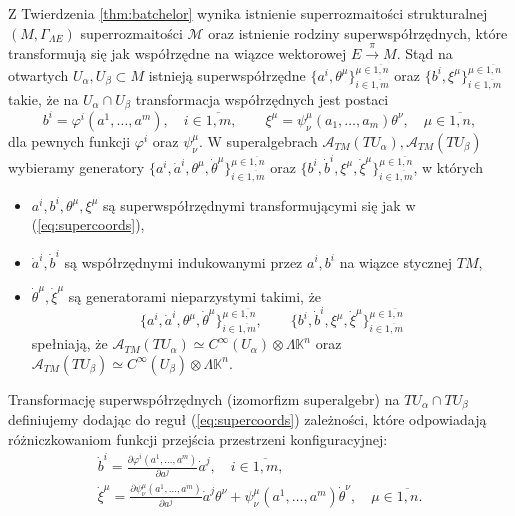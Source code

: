 \documentclass[11pt,a4paper]{report}
\theoremstyle{definition}
\begin{document}
Z Twierdzenia \ref{thm:batchelor} wynika istnienie superrozmaitości strukturalnej $(M, \Gamma_{\Lambda E})$ superrozmaitości $\mathcal{M}$ oraz istnienie rodziny superwspółrzędnych, które transformują się jak współrzędne na wiązce wektorowej $E \stackrel{\pi}{\rightarrow} M$. Stąd na otwartych $U_\alpha, U_\beta \subset M$ istnieją superwspółrzędne $\{a^i, \theta^\mu \}^{\mu \in \overline{1,n}} _{i \in \overline{1,m}}$ oraz $\{b^i, \xi^\mu \}^{\mu \in \overline{1,n}} _{i \in \overline{1,m}}$ takie, że na $U_\alpha \cap U_\beta$ transformacja współrzędnych jest postaci
\begin{equation}
	\label{eq:supercoords}
	b^i = \varphi^i(a^1, \ldots, a^m), \quad i \in \overline{1,m}, \qquad
	\xi^\mu = \psi_\nu^\mu(a_1, \ldots, a_m) \theta^\nu, \quad \mu \in \overline{1,n},
\end{equation}
dla pewnych  funkcji $\varphi^i$ oraz $\psi^\mu _\nu$. W superalgebrach $\mathcal{A}_{TM}(TU_\alpha), \mathcal{A}_{TM}(TU_\beta)$ wybieramy generatory $\{a^i, \dot{a}^i, \theta^\mu, \dot{\theta}^\mu \}^{\mu \in \overline{1,n}} _{i \in \overline{1,m}}$ oraz $\{b^i, \dot{b}^i, \xi^\mu, \dot{\xi}^\mu \}^{\mu \in \overline{1,n}} _{i \in \overline{1,m}}$, w których 
\begin{itemize}
	\item $a^i, b^i, \theta^\mu, \xi^\mu$ są superwspółrzędnymi transformującymi się jak w (\ref{eq:supercoords}),
	\item $\dot{a}^i, \dot{b}^i$ są współrzędnymi indukowanymi przez $a^i, b^i$ na wiązce stycznej $TM$,
	\item $\dot{\theta}^\mu, \dot{\xi}^\mu$ są generatorami nieparzystymi takimi, że$$ \{ a^i, \dot{a}^i, \theta^\mu, \dot{\theta}^\mu \}^{\mu \in \overline{1,n}} _{i \in \overline{1,m}},\qquad \{ b^i, \dot{b}^i, \xi^\mu, \dot{\xi}^\mu \}^{\mu \in \overline{1,n}} _{i \in \overline{1,m}}$$ spełniają, że $\mathcal{A}_{TM}(TU_\alpha)\simeq C^\infty(U_\alpha) \otimes \Lambda \mathbb{K}^n$ oraz $\mathcal{A}_{TM}(TU_\beta) \simeq C^\infty(U_\beta)\otimes \Lambda \mathbb{K}^n$.
\end{itemize}
Transformację superwspółrzędnych (izomorfizm superalgebr) na $TU_\alpha \cap TU_\beta$ definiujemy dodając do reguł (\ref{eq:supercoords}) zależności, które odpowiadają różniczkowaniom funkcji przejścia przestrzeni konfiguracyjnej:
\begin{equation}
	\begin{gathered}
		\dot{b}^i = \frac{\partial \varphi^i (a^1, \ldots, a^m)}{\partial a^j} \dot{a}^j, \quad i \in \overline{1,m}, \\
		\dot{\xi}^\mu = \frac{\partial \psi^\mu_\nu(a^1, \ldots, a^m)}{\partial a^j} \dot{a}^j \theta^\nu + \psi^\mu_\nu(a^1, \ldots, a^m) \dot{\theta}^\nu, \quad \mu \in \overline{1,n}.
	\end{gathered}
\end{equation}
		      			
\end{document}
